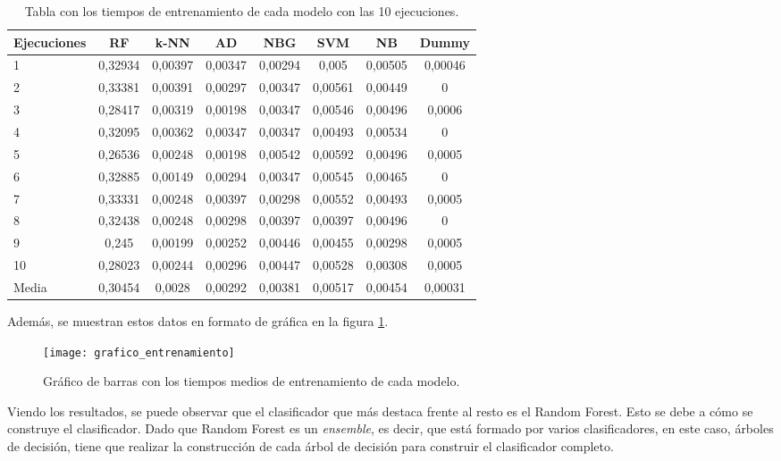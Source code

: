 \begin{table}[h]
	\begin{center}
		\begin{tabular}{ l c c c c c c c }
			\toprule
			\textbf{Ejecuciones} & \textbf{RF} & \textbf{k-NN} & \textbf{AD} & \textbf{NBG} & \textbf{SVM} & \textbf{NB} & \textbf{Dummy} \\ \midrule
			1 & 0,32934 & 0,00397 & 0,00347 & 0,00294 & 0,005 & 0,00505 & 0,00046 \\
			2 & 0,33381 & 0,00391 & 0,00297 & 0,00347 & 0,00561 & 0,00449 & 0 \\ 
			3 & 0,28417 & 0,00319 & 0,00198 & 0,00347 & 0,00546 & 0,00496 & 0,0006 \\
			4 & 0,32095 & 0,00362 & 0,00347 & 0,00347 & 0,00493 & 0,00534 & 0 \\
			5 & 0,26536 & 0,00248 & 0,00198 & 0,00542 & 0,00592 & 0,00496 & 0,0005 \\
			6 & 0,32885 & 0,00149 & 0,00294 & 0,00347 & 0,00545 & 0,00465 & 0 \\
			7 & 0,33331 & 0,00248 & 0,00397 & 0,00298 & 0,00552 & 0,00493 & 0,0005 \\
			8 & 0,32438 & 0,00248 & 0,00298 & 0,00397 & 0,00397 & 0,00496 & 0 \\
			9 & 0,245 & 0,00199 & 0,00252 & 0,00446 & 0,00455 & 0,00298 & 0,0005 \\
			10 & 0,28023 & 0,00244 & 0,00296 & 0,00447 & 0,00528 & 0,00308 & 0,0005 \\ \midrule
			Media & 0,30454 & 0,0028 & 0,00292 & 0,00381 & 0,00517 & 0,00454 & 0,00031 \\ \bottomrule
		\end{tabular}
		\caption{Tabla con los tiempos de entrenamiento de cada modelo con las 10 ejecuciones.}
		\label{tab:tiempos_entrenamiento}
	\end{center}
\end{table}

Además, se muestran estos datos en formato de gráfica en la figura \ref{fig:grafico_entrenamiento}.

\begin{figure}[ht]
	\texttt{[image: grafico\_entrenamiento]}
	\caption{Gráfico de barras con los tiempos medios de entrenamiento de cada modelo.}
	\label{fig:grafico_entrenamiento}
\end{figure} 

Viendo los resultados, se puede observar que el clasificador que más destaca frente al resto es el Random Forest. Esto se debe a cómo se construye el clasificador. Dado que Random Forest es un \textit{ensemble}, es decir, que está formado por varios clasificadores, en este caso, árboles de decisión, tiene que realizar la construcción de cada árbol de decisión para construir el clasificador completo. 

